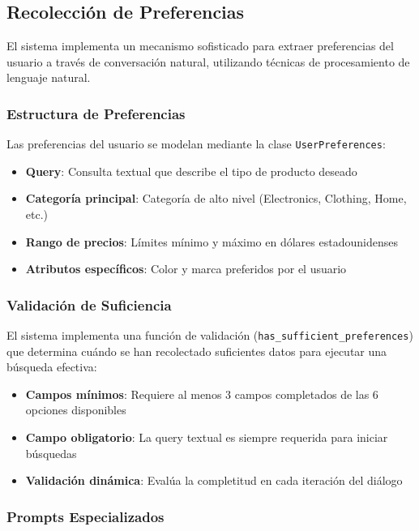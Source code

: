 \subsection{Recolección de Preferencias}

El sistema implementa un mecanismo sofisticado para extraer preferencias del usuario a través de conversación natural, utilizando técnicas de procesamiento de lenguaje natural.

\subsubsection{Estructura de Preferencias}

Las preferencias del usuario se modelan mediante la clase \texttt{UserPreferences}:

\begin{itemize}
    \item \textbf{Query}: Consulta textual que describe el tipo de producto deseado
    \item \textbf{Categoría principal}: Categoría de alto nivel (Electronics, Clothing, Home, etc.)
    \item \textbf{Rango de precios}: Límites mínimo y máximo en dólares estadounidenses
    \item \textbf{Atributos específicos}: Color y marca preferidos por el usuario
\end{itemize}

\subsubsection{Validación de Suficiencia}

El sistema implementa una función de validación (\texttt{has\_sufficient\_preferences}) que determina cuándo se han recolectado suficientes datos para ejecutar una búsqueda efectiva:

\begin{itemize}
    \item \textbf{Campos mínimos}: Requiere al menos 3 campos completados de las 6 opciones disponibles
    \item \textbf{Campo obligatorio}: La query textual es siempre requerida para iniciar búsquedas
    \item \textbf{Validación dinámica}: Evalúa la completitud en cada iteración del diálogo
\end{itemize}

\subsubsection{Prompts Especializados}

